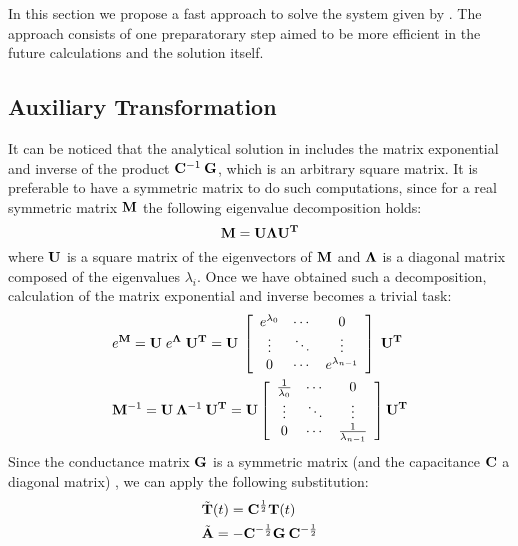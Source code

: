 In this section we propose a fast approach to solve the system given by . The approach consists of one preparatorary step aimed to be more efficient in the future calculations and the solution itself.

\subsection{Auxiliary Transformation}
It can be noticed that the analytical solution in  includes the matrix exponential and inverse of the product $\mathbf{\mathbf{C}}^{-1} \: \mathbf{\mathbf{G}}$, which is an arbitrary square matrix. It is preferable to have a symmetric matrix to do such computations, since for a real symmetric matrix $\mathbf{M}$ the following eigenvalue decomposition holds:
\begin{equation} \label{eq:eigenvalue-decomposition}
  \mathbf{M} = \mathbf{\mathbf{U}} \mathbf{\Lambda} \mathbf{\mathbf{U}}^{\mathbf{T}}
\end{equation}
where $\mathbf{\mathbf{U}}$ is a square matrix of the eigenvectors of $\mathbf{M}$ and $\mathbf{\Lambda}$ is a diagonal matrix composed of the eigenvalues $\lambda_i$. Once we have obtained such a decomposition, calculation of the matrix exponential and inverse becomes a trivial task:
\begin{align*}
  & e^{\mathbf{M}} = \mathbf{\mathbf{U}} \; e^{\mathbf{\Lambda}} \; \mathbf{\mathbf{U}}^{\mathbf{T}} = \mathbf{\mathbf{U}}\: \left[
      \begin{array}{ccc}
        e^{\lambda_0} & \cdots & 0 \\
        \vdots & \ddots & \vdots \\
        0 & \cdots & e^{\lambda_{n - 1}}
      \end{array}
    \right] \; \mathbf{\mathbf{U}}^{\mathbf{T}} \\
  & \mathbf{M}^{-1} = \mathbf{\mathbf{U}} \: \mathbf{\Lambda}^{-1} \: \mathbf{\mathbf{U}}^{\mathbf{T}} = \mathbf{\mathbf{U}} \left[
      \begin{array}{ccc}
        \frac{1}{\lambda_0} & \cdots & 0 \\
        \vdots & \ddots & \vdots \\
        0 & \cdots & \frac{1}{\lambda_{n - 1}}
      \end{array}
    \right] \mathbf{\mathbf{U}}^{\mathbf{T}} \\
\end{align*}
Since the conductance matrix $\mathbf{\mathbf{G}}$ is a symmetric matrix (and the capacitance $\mathbf{\mathbf{C}}$ a diagonal matrix) \cite{rao2007}, we can apply the following substitution:
\begin{align*}
  & \tilde{\mathbf{T}}(t) = \mathbf{C}^{\frac{1}{2}} \mathbf{T}(t) \\
  & \tilde{\mathbf{A}} = -\mathbf{C}^{-\frac{1}{2}} \mathbf{G} \: \mathbf{C}^{-\frac{1}{2}}
\end{align*}
